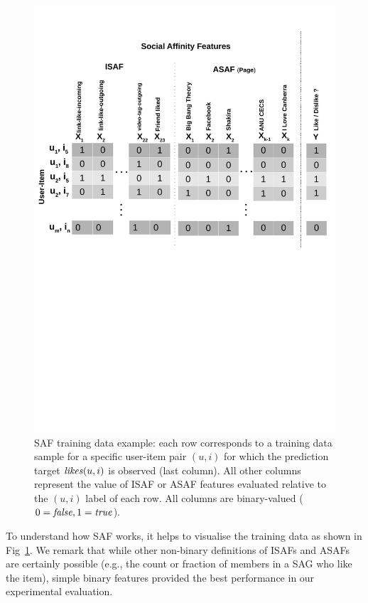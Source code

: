 \begin{figure}[t!]
\centering
\includegraphics[width=1\linewidth]{data/plots/features/saf_features}
\caption{SAF training data example: each row corresponds to a training
  data sample for a specific user-item pair $(u,i)$ for which the
  prediction target $\like(u,i)$ is observed (last column).  All other
  columns represent the value of ISAF or ASAF features
  evaluated relative to the $(u,i)$ label of each row.
  All columns are binary-valued ($0=\false,1=\true$).}
\label{fig:features_overview}
\end{figure}

To understand how SAF works, it helps to visualise the training data as shown
in Fig~\ref{fig:features_overview}.  We remark that while other
non-binary definitions of ISAFs and ASAFs are certainly possible
(e.g., the count or fraction of members in a SAG who like the item),
simple binary features provided the best performance in our
experimental evaluation.

